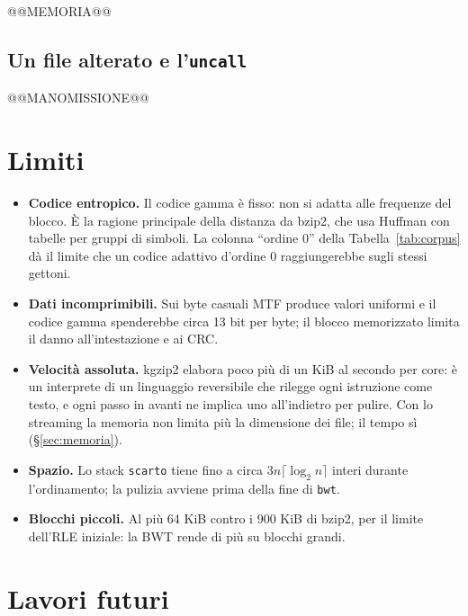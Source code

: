 \documentclass[11pt,a4paper]{article}
\newcommand{\kw}[1]{\texttt{#1}}
\begin{document}
@@MEMORIA@@

\subsection{Un file alterato e l'\texttt{uncall}}
\label{sec:manomissione}

@@MANOMISSIONE@@

\section{Limiti}
\label{sec:limiti}

\begin{itemize}
\item \textbf{Codice entropico.} Il codice gamma è fisso: non si adatta alle frequenze del blocco. È la ragione principale della distanza da bzip2, che usa Huffman con tabelle per gruppi di simboli. La colonna ``ordine 0'' della Tabella~\ref{tab:corpus} dà il limite che un codice adattivo d'ordine 0 raggiungerebbe sugli stessi gettoni.
\item \textbf{Dati incomprimibili.} Sui byte casuali MTF produce valori uniformi e il codice gamma spenderebbe circa 13 bit per byte; il blocco memorizzato limita il danno all'intestazione e ai CRC.
\item \textbf{Velocità assoluta.} kgzip2 elabora poco più di un KiB al secondo per core: è un interprete di un linguaggio reversibile che rilegge ogni istruzione come testo, e ogni passo in avanti ne implica uno all'indietro per pulire. Con lo streaming la memoria non limita più la dimensione dei file; il tempo sì (§\ref{sec:memoria}).
\item \textbf{Spazio.} Lo stack \kw{scarto} tiene fino a circa $3n\lceil\log_2 n\rceil$ interi durante l'ordinamento; la pulizia avviene prima della fine di \kw{bwt}.
\item \textbf{Blocchi piccoli.} Al più 64 KiB contro i 900 KiB di bzip2, per il limite dell'RLE iniziale: la BWT rende di più su blocchi grandi.
\end{itemize}

\section{Lavori futuri}
\end{document}
